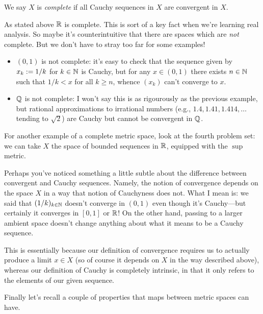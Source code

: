 \begin{definition}
  We say $X$ is \textit{complete} if all Cauchy sequences in $X$ are
  convergent in $X$.
\end{definition}

\begin{examples}
  As stated above $\mathbb{R}$ is complete. This is sort of a key fact when
  we're learning real analysis. So maybe it's counterintuitive that
  there are spaces which are \textit{not} complete. But we don't have
  to stray too far for some examples!
  \begin{itemize}
  \item $(0,1)$ is not complete: it's easy to check that the sequence
    given by $x_k \mathrel{:=} 1/k$ for $k \in \mathbb{N}$ is Cauchy, but for any
    $x \in (0,1)$ there exists $n \in \mathbb{N}$ such that $1/k < x$ for all
    $k \ge n$, whence $(x_k)$ can't converge to $x$.
  \item $\mathbb{Q}$ is not complete: I won't say this is as rigourously as
    the previous example, but rational approximations to irrational
    numbers (e.g., $1.4, 1.41, 1.414, \ldots$ tending to $\sqrt 2$)
    are Cauchy but cannot be convergent in $\mathbb{Q}$.
  \end{itemize}
  For another example of a complete metric space, look at the fourth
  problem set: we can take $X$ the space of bounded sequences in $\mathbb{R}$,
  equipped with the $\sup$ metric.
\end{examples}

\begin{nothing}
  Perhaps you've noticed something a little subtle about the
  difference between convergent and Cauchy sequences. Namely, the
  notion of convergence depends on the space $X$ in a way that notion
  of Cauchyness does not. What I mean is: we said that $(1/k)_{k \in
    \mathbb{N}}$ doesn't converge in $(0,1)$ even though it's Cauchy---but
  certainly it converges in $[0, 1]$ or $\mathbb{R}$! On the other hand,
  passing to a larger ambient space doesn't change anything about what
  it means to be a Cauchy sequence.

  This is essentially because our definition of convergence requires
  us to actually produce a limit $x \in X$ (so of course it depends on
  $X$ in the way described above), whereas our definition of Cauchy is
  completely intrinsic, in that it only refers to the elements of our
  given sequence.
\end{nothing}

Finally let's recall a couple of properties that maps between metric
spaces can have.

